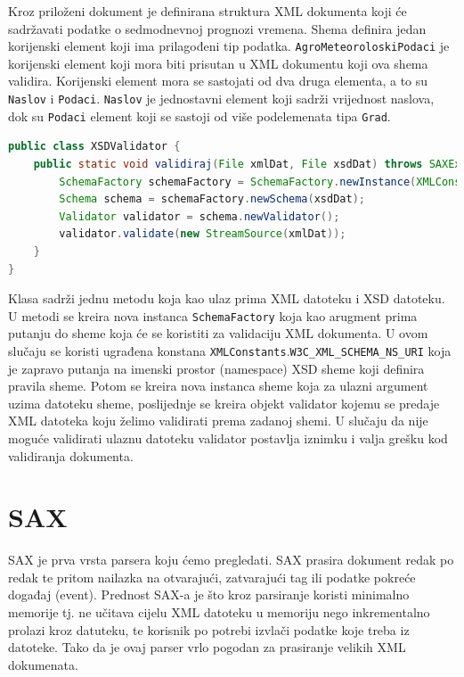 \documentclass[]{foi}
\begin{document}
Kroz priloženi dokument je definirana struktura XML dokumenta koji će sadržavati podatke
o sedmodnevnoj prognozi vremena. Shema definira jedan korijenski element koji ima prilagođeni tip podatka.
\texttt{AgroMeteoroloskiPodaci} je korijenski element koji mora biti prisutan u XML dokumentu
koji ova shema validira. Korijenski element mora se sastojati od dva druga elementa, a to su
\texttt{Naslov} i \texttt{Podaci}. \texttt{Naslov} je jednostavni element koji sadrži vrijednost
naslova, dok su \texttt{Podaci} element koji se sastoji od više podelemenata tipa \texttt{Grad}.

\begin{lstlisting}[language=java, caption={Klasa za validaciju XML datoteke prema XSD shemi}]
public class XSDValidator {
    public static void validiraj(File xmlDat, File xsdDat) throws SAXException, IOException {
        SchemaFactory schemaFactory = SchemaFactory.newInstance(XMLConstants.W3C_XML_SCHEMA_NS_URI);
        Schema schema = schemaFactory.newSchema(xsdDat);
        Validator validator = schema.newValidator();
        validator.validate(new StreamSource(xmlDat));
    }
}
\end{lstlisting}

Klasa sadrži jednu metodu koja kao ulaz prima XML datoteku i XSD datoteku.
U metodi se kreira nova instanca \texttt{SchemaFactory} koja kao arugment prima putanju
do sheme koja će se koristiti za validaciju XML dokumenta. U ovom slučaju se koristi
ugrađena konstana \texttt{XMLConstants$.$W3C\_XML\_SCHEMA\_NS\_URI} koja je zapravo
putanja na imenski prostor (namespace) XSD sheme koji definira pravila sheme.
Potom se kreira nova instanca sheme koja za ulazni argument uzima datoteku
sheme, poslijednje se kreira objekt validator kojemu se predaje XML datoteka koju
želimo validirati prema zadanoj shemi. U slučaju da nije moguće validirati ulaznu
datoteku validator postavlja iznimku i valja grešku kod validiranja dokumenta.

\section{SAX}
SAX je prva vrsta parsera koju ćemo pregledati. SAX prasira dokument redak po redak
te pritom nailazka na otvarajući, zatvarajući tag ili podatke pokreće događaj (event).
Prednost SAX-a je što kroz parsiranje koristi minimalno memorije tj. ne učitava cijelu
XML datoteku u memoriju nego inkrementalno prolazi kroz datuteku, te korisnik po potrebi
izvlači podatke koje treba iz datoteke. Tako da je ovaj parser vrlo pogodan za prasiranje
velikih XML dokumenata.
\end{document}
